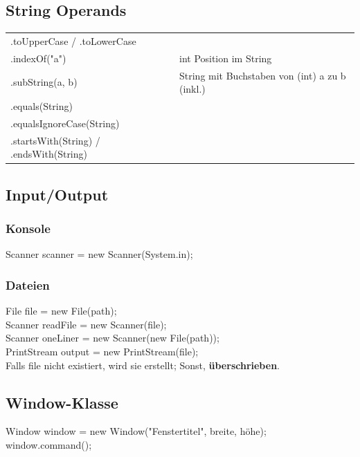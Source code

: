 \documentclass[12pt,a4paper]{article}
\begin{document}
\subsection{String Operands}
\begin{tabularx}{\linewidth}{l X}
.toUpperCase / .toLowerCase\\
.indexOf("a") & int Position im String\\
.subString(a, b) & String mit Buchstaben von (int) a zu b (inkl.)\\
.equals(String)\\
.equalsIgnoreCase(String)\\
.startsWith(String) / .endsWith(String)
\end{tabularx}
\subsection{Input/Output}
\subsubsection{Konsole}
Scanner scanner = new Scanner(System.in);
\subsubsection{Dateien}
File file = new File(path);\\
Scanner readFile = new Scanner(file);\\
Scanner oneLiner = new Scanner(new File(path));\\
PrintStream output = new PrintStream(file);\\
\hspace*{1cm} Falls file nicht existiert, wird sie erstellt; Sonst, \textbf{überschrieben}.
\newpage
\subsection{Window-Klasse}
Window window = new Window("Fenstertitel", breite, höhe);\\
window.command();\\\\
\end{document}
